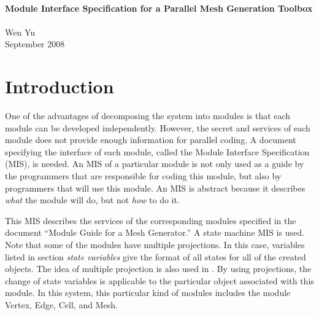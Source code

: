 \documentclass[12pt,titlepage]{article}
\author{Wen Yu}
\begin{document}
\begin{titlepage}

\newcommand{\texttl}{\textsf} %
\newcommand{\textau}{\textsf} %

\begin{center}
 
\HRule \\[0.4cm]
{ \huge \bfseries \texttl{Module Interface Specification for a Parallel Mesh Generation Toolbox}}\\[0.4cm]
 
\HRule \\[2cm]

\textau{\LARGE Wen Yu}\\[2cm]
 
\textau{\LARGE {September 2008}}
 
\vfill
 
\hfill
\textau{\LARGE
{}
}
\end{center}

\end{titlepage}

\tableofcontents

\newpage

\section{Introduction \label{AmisSecIntro}}
One of the advantages of decomposing the system into modules is that each module can be developed independently. However, the secret and services of each module does not provide enough information for parallel coding. A document specifying the interface of each module, called the Module Interface Specification (MIS), is needed. An MIS of a particular module is not only used as a guide by the programmers that are responsible for coding this module, but also by programmers that will use this module. An MIS is abstract because it describes \emph{what} the module will do, but not \emph{how} to do it.

This MIS describes the services of the corresponding modules specified in the document ``Module Guide for a Mesh Generator.''  A state machine MIS is used. Note that some of the modules have multiple projections. In this case, variables listed in section \emph{state variables} give the format of all states for all of the created objects. The idea of multiple projection is also used in \citet{Bauer1995}. By using projections, the change of state variables is applicable to the particular object associated with this module. In this system, this particular kind of modules includes the module Vertex, Edge, Cell, and Mesh.
\end{document}
